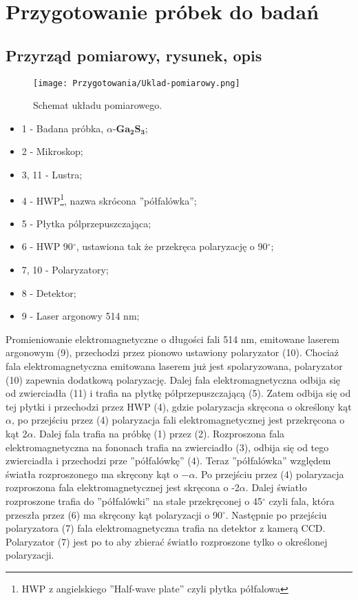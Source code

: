 \newpage

\section{Przygotowanie próbek do badań}

\subsection{Przyrząd pomiarowy, rysunek, opis}
\begin{figure}[H]
	\begin{center}
		\texttt{[image: Przygotowania/Uklad-pomiarowy.png]}
		\caption{Schemat układu pomiarowego.}
	\end{center}
\end{figure}

\begin{itemize}
	\item 1 - Badana próbka, $\alpha$-$\mathbf{Ga_{2}S_{3}}$;
	\item 2 - Mikroskop;
	\item 3, 11 - Lustra;
	\item 4 - HWP\footnote{HWP z angielskiego ''Half-wave plate'' czyli  płytka półfalowa}, nazwa skrócona ''półfalówka'';
	\item 5 - Płytka pólprzepuszczająca;
	\item 6 - HWP 90$^{\circ}$, ustawiona tak że przekręca polaryzację o 90$^{\circ}$;
	\item 7, 10 - Polaryzatory;
	\item 8 - Detektor;
	\item 9 - Laser argonowy 514 nm;
\end{itemize}

Promieniowanie elektromagnetyczne o długości fali 514 nm, emitowane laserem argonowym (9), przechodzi przez pionowo ustawiony polaryzator (10). Chociaż fala elektromagnetyczna emitowana laserem już jest spolaryzowana, polaryzator (10) zapewnia dodatkową polaryzację. Dalej fala elektromagnetyczna odbija się od zwierciadła (11) i trafia na płytkę półprzepuszczającą (5). Zatem odbija się od tej płytki i przechodzi przez HWP (4), gdzie polaryzacja skręcona o określony kąt $\alpha$, po przejściu przez (4) polaryzacja fali elektromagnetycznej jest przekręcona o kąt 2$\alpha$. Dalej fala trafia na próbkę (1) przez (2). Rozproszona fala elektromagnetyczna na fononach trafia na zwierciadło (3), odbija się od tego zwierciadła i przechodzi prze ''półfalówkę'' (4). Teraz ''półfalówka'' względem światła rozproszonego ma skręcony kąt o $-\alpha$. Po przejściu przez (4) polaryzacja rozproszona fala elektromagnetycznej jest skręcona o -2$\alpha$. Dalej światło rozproszone trafia do ''półfalówki'' na stale przekręconej o 45$^\circ$ czyli fala, która przeszła przez (6) ma skręcony kąt polaryzacji o 90$^\circ$. Następnie po przejściu polaryzatora (7) fala elektromagnetyczna trafia na detektor z kamerą CCD. Polaryzator (7) jest po to aby zbierać światło rozproszone tylko o określonej polaryzacji.


